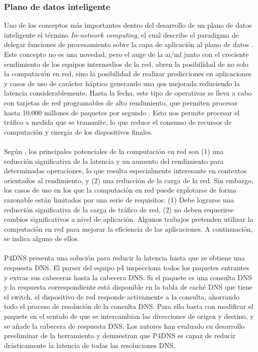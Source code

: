 \subsubsection{Plano de datos inteligente}

Uno de los conceptos más importantes dentro del desarrollo de un plano de datos inteligente el término \textit{In-network computing}, el cual describe el paradigma de delegar funciones de procesamiento sobre la capa de aplicación al plano de datos \cite{hu2021energy}. Este concepto no es una novedad, pero el auge de la \gls{ai}/\gls{ml} junto con el creciente rendimiento de los equipos intermedios de la red, abren la posibilidad de no solo la computación en red, sino la posibilidad de realizar predicciones en aplicaciones y casos de uso de carácter háptico generando una \gls{qos} mejorada reduciendo la latencia considerablemente. Hasta la fecha, este tipo de operativas se lleva a cabo con tarjetas de red programables de alto rendimiento, que permiten procesar hasta 10.000 millones de paquetes por segundo \cite{hu2021energy}. Esto nos permite procesar el tráfico a medida que se transmite, lo que reduce el consumo de recursos de computación y energía de los dispositivos finales.\\
\\
Según \cite{sapio2017network}, los principales potenciales de la computación en red son (1) una reducción significativa de la latencia y un aumento del rendimiento para determinadas operaciones, lo que resulta especialmente interesante en contextos orientados al rendimiento, y (2) una reducción de la carga de la red. Sin embargo, los casos de uso en los que la computación en red puede explotarse de forma razonable están limitados por una serie de requisitos: (1) Debe lograrse una reducción significativa de la carga de tráfico de red, (2) no deben requerirse cambios significativos a nivel de aplicación. Algunos trabajos pretenden utilizar la computación en red para mejorar la eficiencia de las aplicaciones. A continuación, se indica alguno de ellos.\\
\\
P4DNS \cite{woodruff2019p4dns} presenta una solución para reducir la latencia hasta que se obtiene una respuesta DNS. El parser del equipo \gls{p4} inspecciona todos los paquetes entrantes y extrae sus cabeceras hasta la cabecera DNS. Si el paquete es una consulta DNS y la respuesta correspondiente está disponible en la tabla de caché DNS que tiene el switch, el dispositivo de red responde activamente a la consulta, ahorrando todo el proceso de resolución de la consulta DNS. Para ello basta con modificar el paquete en el sentido de que se intercambian las direcciones de origen y destino, y se añade la cabecera de respuesta DNS. Los autores han evaluado su desarrollo preeliminar de la herramienta y demuestran que P4DNS es capaz de reducir drásticamente la latencia de todas las resoluciones DNS.\\


